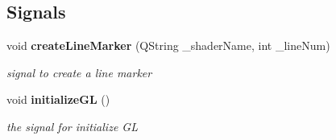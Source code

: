 \subsection*{Signals}
\begin{DoxyCompactItemize}
\item 
void {\bf create\-Line\-Marker} (Q\-String \-\_\-shader\-Name, int \-\_\-line\-Num)
\begin{DoxyCompactList}\small\item\em signal to create a line marker \end{DoxyCompactList}\item 
void {\bf initialize\-G\-L} ()
\begin{DoxyCompactList}\small\item\em the signal for initialize G\-L \end{DoxyCompactList}\end{DoxyCompactItemize}
